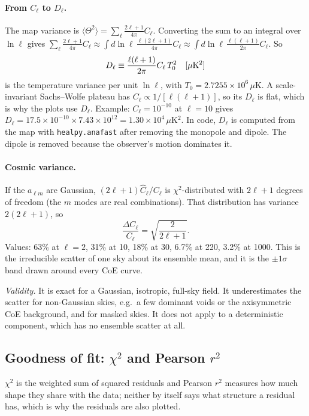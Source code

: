 \documentclass[10pt,twocolumn]{article}
\newcommand{\why}[1]{\par\noindent\textit{Validity.} #1\par}
\begin{document}
\paragraph{From $C_\ell$ to $D_\ell$.} The map variance is $\langle\Theta^2\rangle=\sum_\ell\frac{2\ell+1}{4\pi}C_\ell$. Converting the sum to an integral over $\ln\ell$ gives $\sum_\ell\frac{2\ell+1}{4\pi}C_\ell\approx\int d\ln\ell\,\frac{\ell(2\ell+1)}{4\pi}C_\ell\approx\int d\ln\ell\,\frac{\ell(\ell+1)}{2\pi}C_\ell$. So
\begin{equation}\label{eq7}
D_\ell\equiv\frac{\ell(\ell+1)}{2\pi}C_\ell\,T_0^2\quad[\mu{\rm K}^2]
\end{equation}
is the temperature variance per unit $\ln\ell$, with $T_0=2.7255\times10^6\,\mu$K. A scale-invariant Sachs--Wolfe plateau has $C_\ell\propto1/[\ell(\ell+1)]$, so its $D_\ell$ is flat, which is why the plots use $D_\ell$. Example: $C_\ell=10^{-10}$ at $\ell=10$ gives $D_\ell=17.5\times10^{-10}\times7.43\times10^{12}=1.30\times10^4\,\mu$K$^2$. In code, $D_\ell$ is computed from the map with \texttt{healpy.anafast} after removing the monopole and dipole. The dipole is removed because the observer's motion dominates it.

\paragraph{Cosmic variance.} If the $a_{\ell m}$ are Gaussian, $(2\ell+1)\hat C_\ell/C_\ell$ is $\chi^2$-distributed with $2\ell+1$ degrees of freedom (the $m$ modes are real combinations). That distribution has variance $2(2\ell+1)$, so
\begin{equation}\label{eq8}
\frac{\Delta C_\ell}{C_\ell}=\sqrt{\frac{2}{2\ell+1}} .
\end{equation}
Values: 63\% at $\ell=2$, 31\% at 10, 18\% at 30, 6.7\% at 220, 3.2\% at 1000. This is the irreducible scatter of one sky about its ensemble mean, and it is the $\pm1\sigma$ band drawn around every CoE curve.
\why{It is exact for a Gaussian, isotropic, full-sky field. It underestimates the scatter for non-Gaussian skies, e.g.\ a few dominant voids or the axisymmetric CoE background, and for masked skies. It does not apply to a deterministic component, which has no ensemble scatter at all.}

\subsection{Goodness of fit: $\chi^2$ and Pearson $r^2$}\label{sec:stats}
$\chi^2$ is the weighted sum of squared residuals and Pearson $r^2$ measures how much shape they share with the data; neither by itself says what structure a residual has, which is why the residuals are also plotted.
\end{document}
